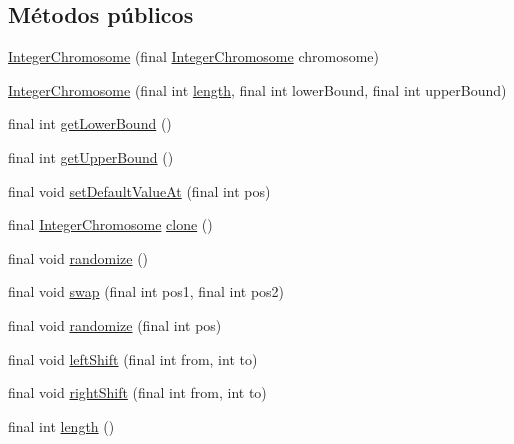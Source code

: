 \subsection*{Métodos públicos}
\begin{DoxyCompactItemize}
\item 
\hyperlink{classjenes_1_1chromosome_1_1_integer_chromosome_a10f477c2c6fb3893a0fc331a933e5b39}{Integer\-Chromosome} (final \hyperlink{classjenes_1_1chromosome_1_1_integer_chromosome}{Integer\-Chromosome} chromosome)
\item 
\hyperlink{classjenes_1_1chromosome_1_1_integer_chromosome_a44849b4866ead257aacae333ad7737bd}{Integer\-Chromosome} (final int \hyperlink{classjenes_1_1chromosome_1_1_integer_chromosome_a8e44ab8d05b2632e72c209c641f10073}{length}, final int lower\-Bound, final int upper\-Bound)
\item 
final int \hyperlink{classjenes_1_1chromosome_1_1_integer_chromosome_ae3932d5f359d42a6fb783f9254e870b7}{get\-Lower\-Bound} ()
\item 
final int \hyperlink{classjenes_1_1chromosome_1_1_integer_chromosome_af5a9d680853b67fd2ad8fc96853957d5}{get\-Upper\-Bound} ()
\item 
final void \hyperlink{classjenes_1_1chromosome_1_1_integer_chromosome_afa0e3d50dbda7f0c84f8558776543d7c}{set\-Default\-Value\-At} (final int pos)
\item 
final \hyperlink{classjenes_1_1chromosome_1_1_integer_chromosome}{Integer\-Chromosome} \hyperlink{classjenes_1_1chromosome_1_1_integer_chromosome_a9189b20273989ee1e83aa21ca11a982d}{clone} ()
\item 
final void \hyperlink{classjenes_1_1chromosome_1_1_integer_chromosome_a8474f73dce296ea5625dc9edb235cd47}{randomize} ()
\item 
final void \hyperlink{classjenes_1_1chromosome_1_1_integer_chromosome_a2a591c336fedcfd457d4d874a2db328e}{swap} (final int pos1, final int pos2)
\item 
final void \hyperlink{classjenes_1_1chromosome_1_1_integer_chromosome_a5f05ea95b9e86f784f6f1bdff3cbfe54}{randomize} (final int pos)
\item 
final void \hyperlink{classjenes_1_1chromosome_1_1_integer_chromosome_a8a05522811de03e5ea9fff08385ac306}{left\-Shift} (final int from, int to)
\item 
final void \hyperlink{classjenes_1_1chromosome_1_1_integer_chromosome_a361afe717a58a8b47316e62178b387f5}{right\-Shift} (final int from, int to)
\item 
final int \hyperlink{classjenes_1_1chromosome_1_1_integer_chromosome_a8e44ab8d05b2632e72c209c641f10073}{length} ()

\end{DoxyCompactItemize}
